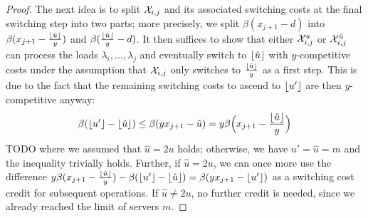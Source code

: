 \begin{proof}
The next idea is to split $\mathcal{X}_{i,j}$ and its associated switching costs at the final switching step into two parts; more precisely, we split $\beta(x_{j+1}-d)$ into $\beta(x_{j+1}-\frac{\lfloor\hat{u}\rfloor}{y})$ and $\beta(\frac{\lfloor\hat{u}\rfloor}{y}-d)$. It then suffices to show that either $\mathcal{X}_{i,j}^u$ or $\mathcal{X}_{i,j}^{\hat{u}}$ can process the loads $\lambda_i,\dotsc,\lambda_j$ and eventually switch to $\lfloor\hat{u}\rfloor$ with $y$-competitive costs under the assumption that $\mathcal{X}_{i,j}$ only switches to $\frac{\lfloor\hat{u}\rfloor}{y}$ as a first step. This is due to the fact that the remaining switching costs to ascend to $\lfloor u'\rfloor$ are then $y$-competitive anyway:
\begin{equation*}
	\beta(\lfloor u'\rfloor-\lfloor\hat{u}\rfloor)\le\beta(yx_{j+1}-\hat{u})=y\beta\Bigl(x_{j+1}-\frac{\lfloor\hat{u}\rfloor}{y}\Bigr)
\end{equation*}
TODO where we assumed that $\hat{u}=2u$ holds; otherwise, we have $u'=\hat{u}=m$ and the inequality trivially holds. Further, if $\hat{u}=2u$, we can once more use the difference $y\beta(x_{j+1}-\frac{\lfloor\hat{u}\rfloor}{y})-\beta(\lfloor u'\rfloor-\lfloor\hat{u}\rfloor)=\beta(yx_{j+1}-\lfloor u'\rfloor)$ as a switching cost credit for subsequent operations. If $\hat{u}\neq2u$, no further credit is needed, since we already reached the limit of servers $m$.


\end{proof}
